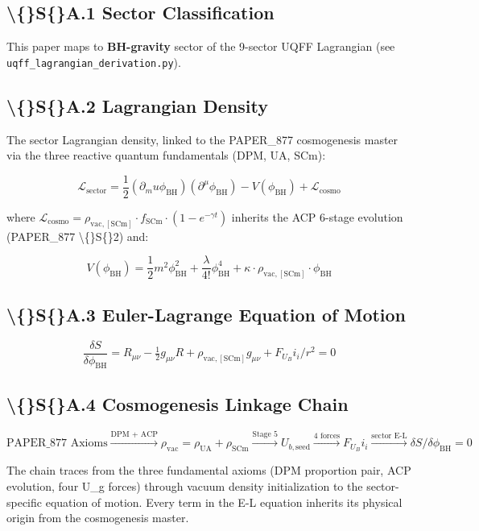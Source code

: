 \documentclass[11pt]{article}
\begin{document}
\subsection*{\textbackslash\{\}S\{\}A.1 Sector Classification}

This paper maps to \textbf{BH-gravity} sector of the 9-sector UQFF Lagrangian (see \verb|uqff_lagrangian_derivation.py|).

\subsection*{\textbackslash\{\}S\{\}A.2 Lagrangian Density}

The sector Lagrangian density, linked to the PAPER\_877 cosmogenesis master via the three reactive quantum fundamentals (DPM, UA, SCm):

$$\mathcal{L}_{\mathrm{sector}} = \frac{1}{2}(\partial_mu \phi_{\mathrm{BH}})(\partial^\mu \phi_{\mathrm{BH}}) - V(\phi_{\mathrm{BH}}) + \mathcal{L}_{\mathrm{cosmo}}$$

where $\mathcal{L}_{\mathrm{cosmo}} = \rho_{\mathrm{vac,[SCm]}} \cdot f_{\mathrm{SCm}} \cdot (1 - e^{-\gamma t})$ inherits the ACP 6-stage evolution (PAPER\_877 \textbackslash\{\}S\{\}2) and:

$$V(\phi_{\mathrm{BH}}) = \frac{1}{2} m^2 \phi_{\mathrm{BH}}^2 + \frac{\lambda}{4!} \phi_{\mathrm{BH}}^4 + \kappa \cdot \rho_{\mathrm{vac,[SCm]}} \cdot \phi_{\mathrm{BH}}$$

\subsection*{\textbackslash\{\}S\{\}A.3 Euler-Lagrange Equation of Motion}

$$\boxed{\frac{\delta S}{\delta \phi_{\mathrm{BH}}} = R_{\mu\nu} - \tfrac{1}{2}g_{\mu\nu}R + \rho_{\mathrm{vac,[SCm]}} g_{\mu\nu} + F_U_Bi_i/r^2 = 0}$$

\subsection*{\textbackslash\{\}S\{\}A.4 Cosmogenesis Linkage Chain}

$$\text{PAPER\_877 Axioms} \xrightarrow{\text{DPM + ACP}} \rho_{\mathrm{vac}} = \rho_{\mathrm{UA}} + \rho_{\mathrm{SCm}} \xrightarrow{\text{Stage 5}} U_{b,\mathrm{seed}} \xrightarrow{\text{4 forces}} F_U_Bi_i \xrightarrow{\text{sector E-L}} \delta S/\delta \phi_{\mathrm{BH}} = 0$$

The chain traces from the three fundamental axioms (DPM proportion pair, ACP evolution, four U\_g forces) through vacuum density initialization to the sector-specific equation of motion. Every term in the E-L equation inherits its physical origin from the cosmogenesis master.
\end{document}
